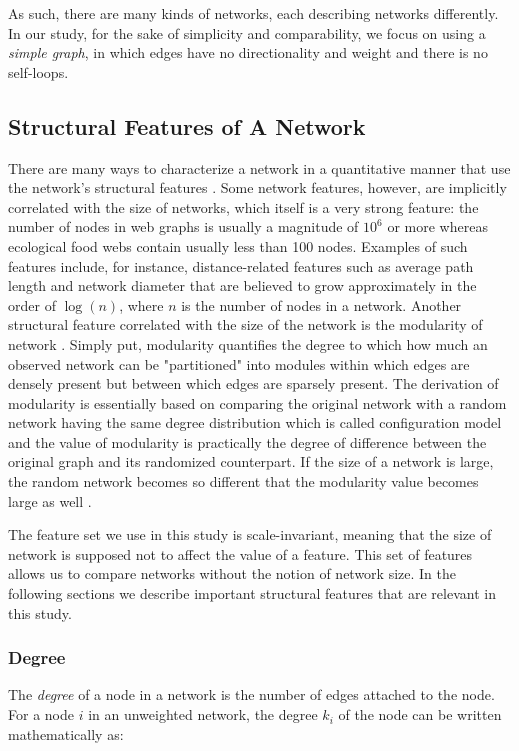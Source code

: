 \documentclass{article}
\begin{document}
	As such, there are many kinds of networks, each describing networks differently. In our study, for the sake of simplicity and comparability, we focus on using a \textit{simple graph}, in which edges have no directionality and weight and there is no self-loops.
	
	\subsection{Structural Features of A Network}
	There are many ways to characterize a network in a quantitative manner that use the network's structural features \cite{Newman:NetworksIntro,NetworkCharacterizationSurvey}. Some network features, however, are implicitly correlated with the size of networks, which itself is a very strong feature: the number of nodes in web graphs is usually a magnitude of $10^6$ or more whereas ecological food webs contain usually less than 100 nodes. Examples of such features include, for instance, distance-related features such as average path length and network diameter that are believed to grow approximately in the order of $\log(n)$, where $n$ is the number of nodes in a network. Another structural feature correlated with the size of the network is the modularity of network \cite{Modularity1}. Simply put, modularity quantifies the degree to which how much an observed network can be "partitioned" into modules within which edges are densely present but between which edges are sparsely present. The derivation of modularity is essentially based on comparing the original network with a random network having the same degree distribution which is called configuration model and the value of modularity is practically the degree of difference between the original graph and its randomized counterpart. If the size of a network is large, the random network becomes so different that the modularity value becomes large as well \cite{ResolutionLimit}.
	
	The feature set we use in this study is scale-invariant, meaning that the size of network is supposed not to affect the value of a feature. This set of features allows us to compare networks without the notion of network size. In the following sections we describe important structural features that are relevant in this study.	
	 
	\subsubsection{Degree}
	The \textit{degree} of a node in a network is the number of edges attached to the node. For a node $i$ in an unweighted network, the degree $k_i$ of the node can be written mathematically as:
	
\end{document}
